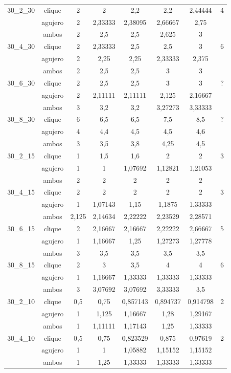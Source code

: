 \documentclass[a4paper]{article}
\begin{document}
\begin{longtable}[!htb]
\begin{center}
\begin{tabular}{|c|c|c|c|c|c|c|c|}
\hline
30_2_30&clique&2&2&2,2&2,2&2,44444&4\\
\cline{2-7}
&agujero&2&2,33333&2,38095&2,66667&2,75&\\
\cline{2-7}
&ambos&2&2,5&2,5&2,625&3&\\
\hline
30_4_30&clique&2&2,33333&2,5&2,5&3&6\\
\cline{2-7}
&agujero&2&2,25&2,25&2,33333&2,375&\\
\cline{2-7}
&ambos&2&2,5&2,5&3&3&\\
\hline
30_6_30&clique&2&2,5&2,5&3&3&?\\
\cline{2-7}
&agujero&2&2,11111&2,11111&2,125&2,16667&\\
\cline{2-7}
&ambos&3&3,2&3,2&3,27273&3,33333&\\
\hline
30_8_30&clique&6&6,5&6,5&7,5&8,5&?\\
\cline{2-7}
&agujero&4&4,4&4,5&4,5&4,6&\\
\cline{2-7}
&ambos&3&3,5&3,8&4,25&4,5&\\
\hline
30_2_15&clique&1&1,5&1,6&2&2&3\\
\cline{2-7}
&agujero&1&1&1,07692&1,12821&1,21053&\\
\cline{2-7}
&ambos&2&2&2&2&2&\\
\hline
30_4_15&clique&2&2&2&2&2&3\\
\cline{2-7}
&agujero&1&1,07143&1,15&1,1875&1,33333&\\
\cline{2-7}
&ambos&2,125&2,14634&2,22222&2,23529&2,28571&\\
\hline
30_6_15&clique&2&2,16667&2,16667&2,22222&2,66667&5\\
\cline{2-7}
&agujero&1&1,16667&1,25&1,27273&1,27778&\\
\cline{2-7}
&ambos&3&3,5&3,5&3,5&3,5&\\
\hline
30_8_15&clique&2&3&3,5&4&4&6\\
\cline{2-7}
&agujero&1&1,16667&1,33333&1,33333&1,33333&\\
\cline{2-7}
&ambos&3&3,07692&3,07692&3,33333&3,5&\\
\hline
30_2_10&clique&0,5&0,75&0,857143&0,894737&0,914798&2\\
\cline{2-7}
&agujero&1&1,125&1,16667&1,28&1,29167&\\
\cline{2-7}
&ambos&1&1,11111&1,17143&1,25&1,33333&\\
\hline
30_4_10&clique&0,5&0,75&0,823529&0,875&0,97619&2\\
\cline{2-7}
&agujero&1&1&1,05882&1,15152&1,15152&\\
\cline{2-7}
&ambos&1&1,25&1,33333&1,33333&1,33333&\\

\end{tabular}
\end{center}
\end{longtable}
\end{document}
